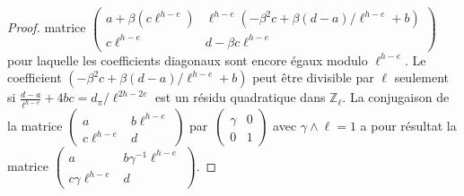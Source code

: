 \documentclass[10pt,a4paper]{book}
\theoremstyle{plain}
\theoremstyle{definition}
\theoremstyle{definition}
\theoremstyle{definition}
\theoremstyle{definition}
\theoremstyle{remark}
\theoremstyle{remark}
\theoremstyle{definition}
\begin{document}
\begin{proof}
matrice $\left ( \begin{smallmatrix}a + \beta (c\ell^{h-e}) & \ell^{h-e}(
-\beta^2c + \beta(d-a)/\ell^{h-e} + b)\\c\ell^{h-e} & d - \beta c\ell^{h-e}
\end{smallmatrix}\right )$ pour laquelle les coefficients diagonaux sont encore
égaux modulo $\ell^{h-e}$. Le coefficient $(-\beta^2c + \beta(d-a)/
\ell^{h-e} + b)$ peut être divisible par $\ell$ seulement si $\frac{d-a}{\ell^{h-e}}+4bc=
d_{\pi}/{\ell^{2h-2e}}$ est un résidu quadratique dans $\mathbb{Z}_{\ell}$. 
La conjugaison de la matrice $\left ( \begin{smallmatrix}a & b\ell^{h-e}\\c\ell^{h-e} & d
\end{smallmatrix}\right )$ par~$\left ( \begin{smallmatrix} \gamma & 0 \\0 & 1
\end{smallmatrix} \right )$ avec $\gamma \wedge \ell=1$  a pour résultat la 
matrice $\left ( \begin{smallmatrix}a  & b\gamma^{-1} \ell^{h-e} \\c \gamma 
\ell^{h-e} & d \end{smallmatrix}\right )$.
\end{proof}
\end{document}
